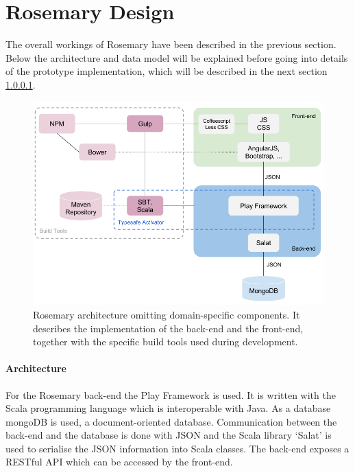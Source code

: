 \section{Rosemary Design}
\label{reuse-rosemary}


The overall workings of Rosemary have been described in the previous section.
Below the architecture and data model will be explained before going into details of the \ivfsystem{} prototype implementation, which will be described in the next section \ref{}.

\begin{figure}[!hb]
	\centering
	\includegraphics[width=0.7\linewidth]{images/rosemary-architecture}
	\caption{
		Rosemary architecture omitting domain-specific components.
		It describes the implementation of the back-end and the front-end, 
		together with the specific build tools used during development.
	}
	\label{fig:reuse-rosemary-architecture}
\end{figure}

\paragraph{Architecture} 
For the Rosemary back-end the Play Framework \cite{play} is used.
It is written with the Scala \cite{scala} programming language which is interoperable with Java.
As a database mongoDB \cite{mongo} is used, a document-oriented database.
Communication between the back-end and the database is done with JSON \cite{json} and the Scala library `Salat' is used to serialise the JSON information into Scala classes.
The back-end exposes a RESTful API which can be accessed by the front-end.

